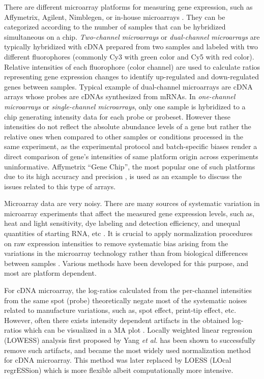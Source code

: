 There are different microarray platforms for measuring gene expression, such as Affymetrix, Agilent, Nimblegen, or in-house microarrays \cite{Sasik2004}. They can be categorized according to the number of samples that can be hybridized simultaneous on a chip. \textit{Two-channel microarrays} or \textit{dual-channel microarrays} are typically hybridized with cDNA prepared from two samples and labeled with two different fluorophores (commonly Cy3 with green color and Cy5 with red color). Relative intensities of each fluorophore (color channel) are used to calculate ratios representing gene expression changes to identify up-regulated and down-regulated genes between samples. Typical example of dual-channel microarrays are cDNA arrays whose probes are cDNAs synthesized from mRNAs. In \textit{one-channel microarrays} or \textit{single-channel   microarrays}, only one sample is hybridized to a chip generating intensity data for each probe or probeset. However these intensities do not reflect the absolute abundance levels of a gene but rather the relative ones when compared to other samples or conditions processed in the same experiment, as the experimental protocol and batch-specific biases render a direct comparison of gene's intensities of same platform origin across experiments uninformative. Affymetrix ``Gene Chip'', the most popular one of such platforms due to its high accuracy and precision \cite{Irizarry2005}, is used as an example to discuss the issues related to this type of arrays.


Microarray data are very noisy.  There are many sources of systematic variation in microarray experiments that affect the measured gene expression levels, such as, heat and light sensitivity, dye labeling and detection efficiency, and unequal quantities of starting RNA, etc \cite{Kerr2001,Zakharkin2005}. It is crucial to apply normalization procedures on raw expression intensities to remove systematic bias arising from the variations in the microarray technology rather than from biological differences between samples  \cite{Quackenbush2002}. Various methods have been developed for this purpose, and most are platform dependent.

For cDNA microarray, the log-ratios calculated from the per-channel intensities from the same spot (probe) theoretically negate most of the systematic noises related to manufacture variations, such as, spot effect, print-tip effect, etc. However, often there exists intensity dependent artifacts in the obtained log-ratios which can be visualized in a MA plot \cite{Yang2002}. Locally weighted linear regression (LOWESS) analysis \cite{Cleveland1979} first proposed by Yang \textit{et al.} \cite{Yang2002} has been shown to successfully remove such artifacts, and became the most widely used normalization method for cDNA microarray. This method was later replaced by LOESS (LOcal regrESSion) which is more flexible albeit computationally more intensive.


